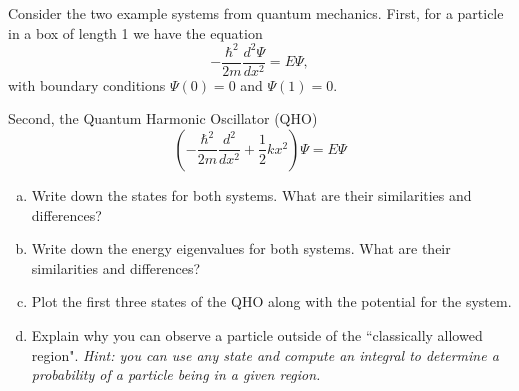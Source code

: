 \documentclass[12pt]{amsbook}
\begin{document}
\newpage
\begin{problem}
Consider the two example systems from quantum mechanics. First, for a particle in a box of length 1 we have the equation
\[
-\frac{\hbar^2}{2m}\frac{d^2 \Psi}{dx^2} = E\Psi,
\]
with boundary conditions $\Psi(0)=0$ and $\Psi(1)=0$.

Second,  the Quantum Harmonic Oscillator (QHO)
\[
\left(-\frac{\hbar^2}{2m} \frac{d^2}{dx^2} + \frac{1}{2} k x^2\right) \Psi = E\Psi
\]
\begin{enumerate}[(a)]
    \item Write down the states for both systems. What are their similarities and differences?
    \item Write down the energy eigenvalues for both systems. What are their similarities and differences?
    \item Plot the first three states of the QHO along with the potential for the system.
    \item Explain why you can observe a particle outside of the ``classically allowed region". \emph{Hint: you can use any state and compute an integral to determine a probability of a particle being in a given region.}
\end{enumerate}
\end{problem}
\end{document}
